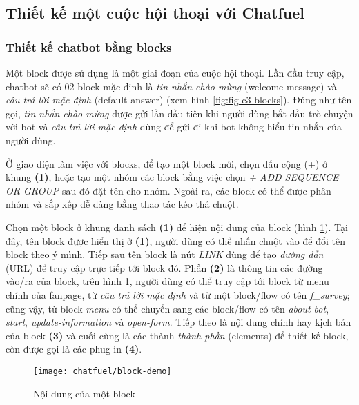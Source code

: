 \subsection{Thiết kế một cuộc hội thoại với Chatfuel}
\subsubsection{Thiết kế chatbot bằng blocks}
Một block được sử dụng là một giai đoạn của cuộc hội thoại. Lần đầu truy cập, chatbot sẽ có 02 block mặc định là \textit{tin nhắn chào mừng} (welcome message) và \textit{câu trả lời mặc định} (default answer) (xem hình \ref{fig:fig-c3-blocks}). Đúng như tên gọi, \textit{tin nhắn chào mừng} được gửi lần đầu tiên khi người dùng bắt đầu trò chuyện với bot và \textit{câu trả lời mặc định} dùng để gửi đi khi bot không hiểu tin nhắn của người dùng.\par
Ở giao diện làm việc với blocks, để tạo một block mới, chọn dấu cộng (+) ở khung \textbf{(1)}, hoặc tạo một nhóm các block bằng việc chọn \textit{+ ADD SEQUENCE OR GROUP} sau đó đặt tên cho nhóm. Ngoài ra, các block có thể được phân nhóm và sắp xếp dễ dàng bằng thao tác kéo thả chuột.\par
Chọn một block ở khung danh sách \textbf{(1)} để hiện nội dung của block (hình \ref{fig:fig-c3-block-demo}). Tại đây, tên block được hiển thị ở \textbf{(1)}, người dùng có thể nhấn chuột vào để đổi tên block theo ý mình. Tiếp sau tên block là nút \textit{LINK} dùng để tạo \textit{đường dẫn} (URL) để truy cập trực tiếp tới block đó. Phần \textbf{(2)} là thông tin các đường vào/ra của block, trên hình \ref{fig:fig-c3-block-demo}, người dùng có thể truy cập tới block từ menu chính của fanpage, từ \textit{câu trả lời mặc định} và từ một block/flow có tên \textit{f\_survey}; cũng vậy, từ block \textit{menu} có thể chuyển sang các block/flow có tên \textit{about-bot}, \textit{start}, \textit{update-information} và \textit{open-form}. Tiếp theo là nội dung chính hay kịch bản của block \textbf{(3)} và cuối cùng là các thành \textit{thành phần} (elements) để thiết kế block, còn được gọi là các phug-in \textbf{(4)}.\par
\begin{figure}[htb!]\centering
	\texttt{[image: chatfuel/block-demo]}
	\caption{Nội dung của một block}
	\label{fig:fig-c3-block-demo}
\end{figure}\par


